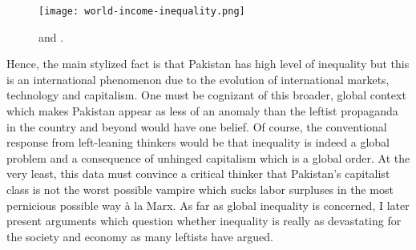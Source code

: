 \documentclass[12pt]{article}
\newcommand{\1}{\mathbbm 1}
\begin{document}
	
		\begin{figure}[H]
		\begin{center}
			\texttt{[image: world-income-inequality.png]}		
			\caption{\cite{chancel2022world} and \cite{solt2016standardized}.}
		\end{center}
	\end{figure}
	
	
	
	
Hence, the main stylized fact is that Pakistan has high level of inequality but this is an international phenomenon due to the evolution of international markets, technology and capitalism. One must be cognizant of this broader, global context which makes Pakistan appear as less of an anomaly than the leftist propaganda in the country and beyond would have one belief. Of course, the conventional response from left-leaning thinkers would be that inequality is indeed a global problem and a consequence of unhinged capitalism which is a global order. At the very least, this data must convince a critical thinker that Pakistan's capitalist class is not the worst possible vampire which sucks labor surpluses in the most pernicious possible way \`a la Marx. As far as global inequality is concerned, I later present arguments which question whether inequality is really as devastating for the society and economy as many leftists have argued.
		
		
		
		
		
		
		
		
		
	
\end{document}
